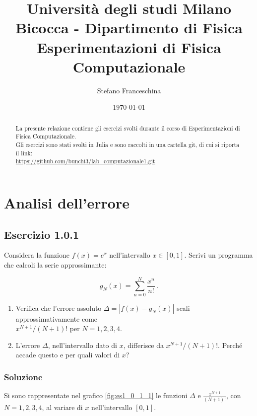 \documentclass[letterpaper, 12pt]{article}
\numberwithin{equation}{section}    %
\begin{document}
\title{{\small Università degli studi Milano Bicocca - Dipartimento di Fisica}\\
	Esperimentazioni di Fisica Computazionale}
\author{Stefano Franceschina}
\date{\today}
\maketitle
\thispagestyle{logoheader}

\begin{abstract} 
La presente relazione contiene gli esercizi svolti durante il corso di 
Esperimentazioni di Fisica Computazionale. \\
Gli esercizi sono stati svolti in Julia e sono raccolti in una cartella git, di cui si riporta il link: \\
\url{https://github.com/bunchi3/lab_computazionale1.git} \\

\end{abstract}
\tableofcontents
\newpage

\section{Analisi dell'errore}
\subsection{Esercizio 1.0.1}
Considera la funzione $f(x)=e^x$ nell'intervallo $x\in [0,1]$. Scrivi un programma che calcoli
la serie approssimante:

\begin{equation}
    g_N(x)=\sum_{n=0}^N \frac{x^n}{n!}\,.
\end{equation}

\begin{enumerate}
    \item Verifica che l'errore assoluto $\Delta=|f(x)-g_N(x)|$ scali approssimativamente come \\ 
    $x^{N+1}/(N+1)!$ per $N=1,2,3,4$.
    \item L'errore $\Delta$, nell'intervallo dato di $x$, differisce da $x^{N+1}/(N+1)!$. 
    Perché accade questo e per quali valori di $x$?
\end{enumerate}

\subsubsection{Soluzione}
Si sono rappresentate nel grafico \ref{fig:es1_0_1_1} le funzioni $\Delta$ e $\frac{x^{N+1}}{(N+1)!}$, con 
$N=1,2,3, 4$, al variare di $x$ nell'intervallo $[0,1]$. 
\end{document}
